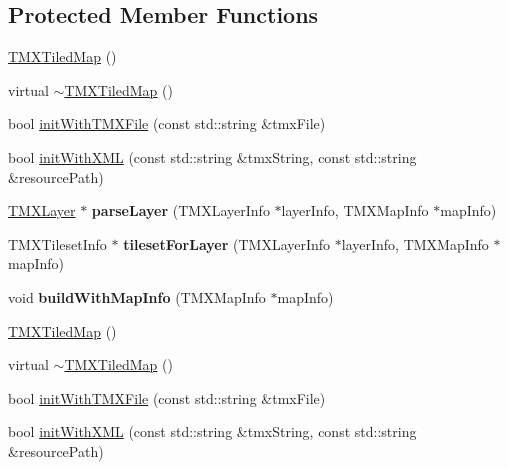 \subsection*{Protected Member Functions}
\begin{DoxyCompactItemize}
\item 
\hyperlink{classexperimental_1_1TMXTiledMap_a4908e56e25f32661814cf96d7fb12e0a}{T\+M\+X\+Tiled\+Map} ()
\item 
virtual \hyperlink{classexperimental_1_1TMXTiledMap_a4a0406798cb65a4a4dde5f667172965c}{$\sim$\+T\+M\+X\+Tiled\+Map} ()
\item 
bool \hyperlink{classexperimental_1_1TMXTiledMap_a4e75b0b3333616d3898b6119644e4137}{init\+With\+T\+M\+X\+File} (const std\+::string \&tmx\+File)
\item 
bool \hyperlink{classexperimental_1_1TMXTiledMap_a949cfae17a8c6239e4d433dcae521997}{init\+With\+X\+ML} (const std\+::string \&tmx\+String, const std\+::string \&resource\+Path)
\item 
\mbox{\label{classexperimental_1_1TMXTiledMap_ab5d014ac35d3cc10d57e1360527cce27}} 
\hyperlink{classexperimental_1_1TMXLayer}{T\+M\+X\+Layer} $\ast$ {\bfseries parse\+Layer} (T\+M\+X\+Layer\+Info $\ast$layer\+Info, T\+M\+X\+Map\+Info $\ast$map\+Info)
\item 
\mbox{\label{classexperimental_1_1TMXTiledMap_a73930cb47843cada3c229e1f9e203f71}} 
T\+M\+X\+Tileset\+Info $\ast$ {\bfseries tileset\+For\+Layer} (T\+M\+X\+Layer\+Info $\ast$layer\+Info, T\+M\+X\+Map\+Info $\ast$map\+Info)
\item 
\mbox{\label{classexperimental_1_1TMXTiledMap_a23841a41fe9bd8ac83780b22504185e5}} 
void {\bfseries build\+With\+Map\+Info} (T\+M\+X\+Map\+Info $\ast$map\+Info)
\item 
\hyperlink{classexperimental_1_1TMXTiledMap_a4908e56e25f32661814cf96d7fb12e0a}{T\+M\+X\+Tiled\+Map} ()
\item 
virtual \hyperlink{classexperimental_1_1TMXTiledMap_a30706ffe94dff09ee540cd1d04d4176a}{$\sim$\+T\+M\+X\+Tiled\+Map} ()
\item 
bool \hyperlink{classexperimental_1_1TMXTiledMap_aae828632c34c0ee3b5519dd7611b0410}{init\+With\+T\+M\+X\+File} (const std\+::string \&tmx\+File)
\item 
bool \hyperlink{classexperimental_1_1TMXTiledMap_a12ec440cf487c2bb5ddbfad3f59d7a08}{init\+With\+X\+ML} (const std\+::string \&tmx\+String, const std\+::string \&resource\+Path)

\end{DoxyCompactItemize}
